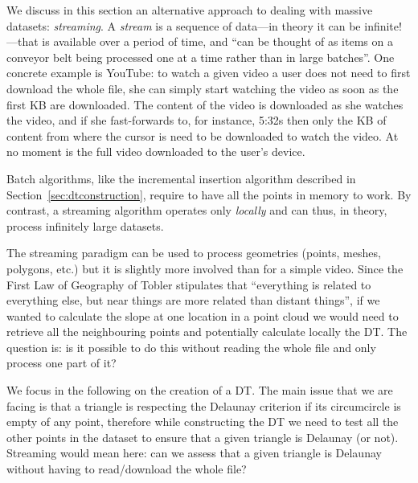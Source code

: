We discuss in this section an alternative approach to dealing with massive datasets: \emph{streaming}.%
A \emph{stream} is a sequence of data---in theory it can be infinite!---that is available over a period of time, and ``can be thought of as items on a conveyor belt being processed one at a time rather than in large batches''.
One concrete example is YouTube: to watch a given video a user does not need to first download the whole file, she can simply start watching the video as soon as the first KB are downloaded.
The content of the video is downloaded as she watches the video, and if she fast-forwards to, for instance, 5:32s then only the KB of content from where the cursor is need to be downloaded to watch the video.
At no moment is the full video downloaded to the user's device.

%

Batch algorithms, like the incremental insertion algorithm described in Section~\ref{sec:dtconstruction},%
require to have all the points in memory to work.
By contrast, a streaming algorithm operates only \emph{locally} and can thus, in theory, process infinitely large datasets.

%

The streaming paradigm can be used to process geometries (points, meshes, polygons, etc.) but it is slightly more involved than for a simple video.
Since the First Law of Geography of Tobler stipulates that ``everything is related to everything else, but near things are more related than distant things'', 
if we wanted to calculate the slope at one location in a point cloud we would need to retrieve all the neighbouring points and potentially calculate locally the DT\@.
The question is: is it possible to do this without reading the whole file and only process one part of it?

%

We focus in the following on the creation of a DT\@.
The main issue that we are facing is that a triangle is respecting the Delaunay criterion if its circumcircle is empty of any point, therefore while constructing the DT we need to test all the other points in the dataset to ensure that a given triangle is Delaunay (or not).
Streaming would mean here: can we assess that a given triangle is Delaunay without having to read/download the whole file?

